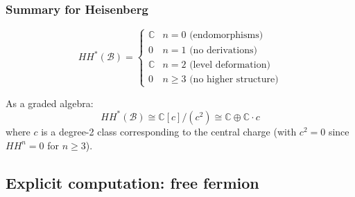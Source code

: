 \begin{example}
\subsubsection{Summary for Heisenberg}

\[HH^*(\mathcal{B}) = \begin{cases}
\mathbb{C} & n = 0 \text{ (endomorphisms)}\\
0 & n = 1 \text{ (no derivations)}\\
\mathbb{C} & n = 2 \text{ (level deformation)}\\
0 & n \geq 3 \text{ (no higher structure)}
\end{cases}\]

As a graded algebra:
\[HH^*(\mathcal{B}) \cong \mathbb{C}[c]/(c^2) \cong \mathbb{C} \oplus \mathbb{C} \cdot c\]
where $c$ is a degree-2 class corresponding to the central charge (with $c^2 = 0$ since $HH^n = 0$ for $n \geq 3$).
\end{example}

\subsection{Explicit computation: free fermion}

